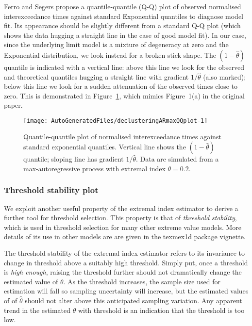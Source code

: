 \documentclass[10pt]{article}\usepackage[]{graphicx}\usepackage[]{color}
\makeatletter
\def\maxwidth{ %
  \ifdim\Gin@nat@width>\linewidth
    \linewidth
  \else
    \Gin@nat@width
  \fi
}
\newenvironment{knitrout}{}{} %
\makeatother
\begin{document}
Ferro and Segers propose a quantile-quantile (Q-Q) plot of observed normalised interexceedance times against standard Exponential quantiles to diagnose model fit.  Its appearance should be slightly different from a standard Q-Q plot (which shows the data hugging a straight line in the case of good model fit).  In our case, since the underlying limit model is a mixture of degeneracy at zero and the Exponential distribution, we look instead for a broken stick shape. The $(1-\hat\theta)$ quantile is indicated with a vertical line: above this line we look for the observed and theoretical quantiles hugging a straight line with gradient $1/\hat\theta$ (also marked); below this line we look for a sudden attenuation of the observed times close to zero.  This is demonstrated in Figure~\ref{fig:ARmaxQQplot}, which mimics Figure~1(a) in the original paper.

\begin{figure}
\begin{center}
\begin{knitrout}
\color{fgcolor}
\texttt{[image: AutoGeneratedFiles/declusteringARmaxQQplot-1]} 

\end{knitrout}
\end{center}
\caption{Quantile-quantile plot of normalised interexceedance times against standard exponential quantiles.  Vertical line shows the $(1-\hat\theta)$ quantile; sloping line has gradient $1/\hat\theta$.  Data are simulated from a max-autoregressive process with extremal index $\theta=0.2$. \label{fig:ARmaxQQplot}}
\end{figure}
%
\subsubsection{Threshold stability plot}
%
We exploit another useful property of the extremal index estimator to derive a further tool for threshold selection.  This property is that of {\it threshold stability}, which is used in threshold selection for many other extreme value models.  More details of its use in other models are are given in the texmex1d package vignette.

The threshold stability of the extremal index estimator refers to its invariance to change in threshold above a suitably high threshold.  Simply put, once a threshold is {\it high enough}, raising the threshold further should not dramatically change the estimated value of $\theta$. As the threshold increases, the sample size used for estimation will fall so sampling uncertainty will increase, but the estimated values of of $\hat\theta$ should not alter above this anticipated sampling variation.  Any apparent trend in the estimated $\theta$ with threshold is an indication that the threshold is too low.
\end{document}
